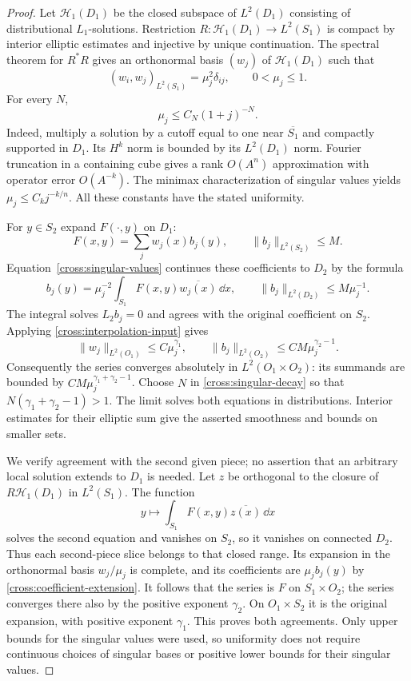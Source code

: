 \begin{proof}
Let $\mathcal H_1(D_1)$ be the closed subspace of $L^2(D_1)$ consisting
of distributional $L_1$-solutions.  Restriction
$R:\mathcal H_1(D_1)\to L^2(S_1)$ is compact by interior elliptic
estimates and injective by unique continuation.  The spectral theorem
for $R^*R$ gives an orthonormal basis $(w_j)$ of
$\mathcal H_1(D_1)$ such that
\begin{equation}\label{cross:singular-values}
 (w_i,w_j)_{L^2(S_1)}=\mu_j^2\delta_{ij},
 \qquad 0<\mu_j\le1.
\end{equation}
For every $N$,
\begin{equation}\label{cross:singular-decay}
 \mu_j\le C_N(1+j)^{-N}.
\end{equation}
Indeed, multiply a solution by a cutoff equal to one near
$\overline{S_1}$ and compactly supported in $D_1$.  Its $H^k$ norm is
bounded by its $L^2(D_1)$ norm.  Fourier truncation in a containing cube
gives a rank $O(A^n)$ approximation with operator error $O(A^{-k})$.
The minimax characterization of singular values yields
$\mu_j\le C_kj^{-k/n}$.  All these constants have the stated uniformity.

For $y\in S_2$ expand $F(\cdot,y)$ on $D_1$:
\[
 F(x,y)=\sum_j w_j(x)b_j(y),\qquad
 \|b_j\|_{L^2(S_2)}\le M.
\]
Equation~\eqref{cross:singular-values} continues these coefficients to
$D_2$ by the formula
\begin{equation}\label{cross:coefficient-extension}
 b_j(y)=\mu_j^{-2}\int_{S_1}F(x,y)\overline{w_j(x)}\,\dd x,
 \qquad \|b_j\|_{L^2(D_2)}\le M\mu_j^{-1}.
\end{equation}
The integral solves $L_2b_j=0$ and agrees with the original coefficient
on $S_2$.  Applying \eqref{cross:interpolation-input} gives
\[
 \|w_j\|_{L^2(O_1)}\le C\mu_j^{\gamma_1},\qquad
 \|b_j\|_{L^2(O_2)}\le CM\mu_j^{\gamma_2-1}.
\]
Consequently the series converges absolutely in $L^2(O_1\times O_2)$:
its summands are bounded by $CM\mu_j^{\gamma_1+\gamma_2-1}$.
Choose $N$ in \eqref{cross:singular-decay} so that
$N(\gamma_1+\gamma_2-1)>1$.  The limit solves both equations
in distributions.  Interior estimates for their elliptic sum give
the asserted smoothness and bounds on smaller sets.

We verify agreement with the second given piece; no assertion that
an arbitrary local solution extends to $D_1$ is needed.  Let $z$ be
orthogonal to the closure of $R\mathcal H_1(D_1)$ in $L^2(S_1)$.
The function
\[
 y\longmapsto\int_{S_1}F(x,y)\overline{z(x)}\,\dd x
\]
solves the second equation and vanishes on $S_2$, so it vanishes on
connected $D_2$.  Thus each second-piece slice belongs to that closed
range.  Its expansion in the orthonormal basis $w_j/\mu_j$ is complete,
and its coefficients are $\mu_jb_j(y)$ by
\eqref{cross:coefficient-extension}.  It follows that the series is
$F$ on $S_1\times O_2$; the series converges there also by the positive
exponent $\gamma_2$.  On $O_1\times S_2$ it is the original expansion,
with positive exponent $\gamma_1$.  This proves both agreements.
Only upper bounds for the singular values were used, so uniformity
does not require continuous choices of singular bases or positive
lower bounds for their singular values.
\end{proof}

